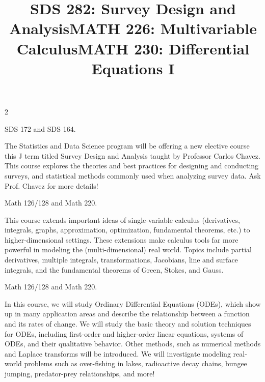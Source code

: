 \documentclass[12pt]{article}
\newcommand{\bolder}{\textbf}
\begin{document}
\begin{multicols}{2}

\begin{tcolorbox}[colback=white, colframe=black]
    \begin{center}
    \title{{\large \bolder{SDS 282: Survey Design and Analysis}}}
    \end{center}
\end{tcolorbox}

 SDS 172 and SDS 164.

The Statistics and Data Science program will be offering a new elective course this J term titled Survey Design and Analysis taught by Professor Carlos Chavez. This course explores the theories and best practices for designing and conducting surveys, and statistical methods commonly used when analyzing survey data. Ask Prof. Chavez for more details!  

\begin{tcolorbox}[colback=white, colframe=black]
    \begin{center}
    \title{{\large \bolder{MATH 226: Multivariable Calculus}}}
    \end{center}
\end{tcolorbox}

 Math 126/128 and Math 220.

This course extends important ideas of single-variable calculus (derivatives, integrals, graphs, approximation, optimization, fundamental theorems, etc.) to higher-dimensional settings. These extensions make calculus tools far more powerful in modeling the (multi-dimensional) real world. Topics include partial derivatives, multiple integrals, transformations, Jacobians, line and surface integrals, and the fundamental theorems of Green, Stokes, and Gauss.


\begin{tcolorbox}[colback=white, colframe=black]
    \begin{center}
    \title{{\large \bolder{MATH 230: Differential Equations I}}}
    \end{center}
\end{tcolorbox}

 Math 126/128 and Math 220.

In this course, we will study Ordinary Differential Equations (ODEs), which show up in many application areas and describe the relationship between a function and its rates of change. We will study the basic theory and solution techniques for ODEs, including first-order and higher-order linear equations, systems of ODEs, and their qualitative behavior. Other methods, such as numerical methods and Laplace transforms will be introduced. We will investigate modeling real-world problems such as over-fishing in lakes, radioactive decay chains, bungee jumping, predator-prey relationships, and more! 



\end{multicols}
\end{document}
